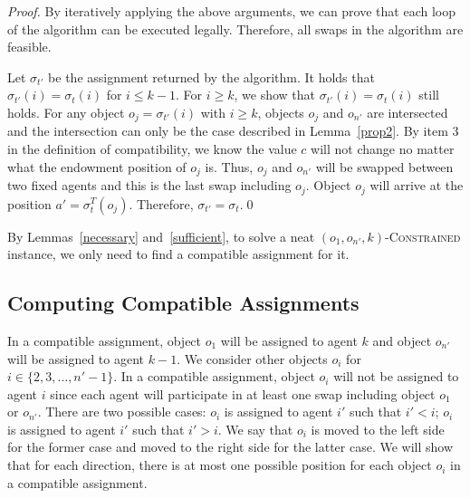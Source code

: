 \begin{proof}
    By iteratively applying the above arguments, we can prove that each loop of the algorithm can be executed legally.
    Therefore, all swaps in the algorithm are feasible.

    Let $\sigma _{t'}$ be the assignment returned by the algorithm. It holds that  $\sigma _{t'}(i)=\sigma _{t}(i)$ for $i\leq k-1$.
    For $i\geq k$, we show that  $\sigma _{t'}(i)=\sigma _{t}(i)$ still holds.  For any object $o_j=\sigma _{t'}(i)$ with $i\geq k$,
    objects $o_j$ and $o_{n'}$ are intersected and the intersection can only be the case described in Lemma~\ref{prop2}.
    By item 3 in the definition of compatibility, we know the value $c$ will not change no matter what the endowment position of $o_j$ is.
    Thus, $o_j$ and $o_{n'}$ will be swapped between two fixed agents and this is the last swap including $o_j$. Object $o_j$ will arrive at the position $a'=\sigma^T_{t}(o_j)$. Therefore, $\sigma _{t'}=\sigma _{t}$.\qed
\end{proof}

By Lemmas~\ref{necessary} and~\ref{sufficient}, to solve a neat $(o_1,o_{n'},k)$-\textsc{Constrained} instance, we only need to find a compatible assignment for it.

\subsection{Computing Compatible Assignments}
In a compatible assignment, object $o_1$ will be assigned to agent $k$ and object $o_{n'}$ will be assigned to agent $k-1$.
We consider other objects $o_i$ for $i\in\{2,3,\dots, n'-1\}$. In a compatible assignment, object $o_i$ will not be assigned to agent $i$ since each agent will participate in at least one swap including object $o_1$ or $o_{n'}$. There are two possible cases:  $o_i$ is assigned to agent $i'$ such that
$i'< i$; $o_i$ is assigned to agent $i'$ such that $i'> i$. We say that $o_i$ is moved to the left side for the former case and moved to the right side for the latter case. We will show that for each direction, there is at most one possible position for each object $o_i$ in a compatible assignment.



